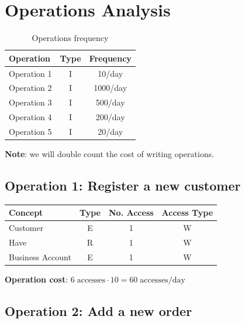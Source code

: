 \section*{Operations Analysis}
\begin{table}[H]
    \centering
    \begin{tabular}{|l|c|c|}
        \hline
        \textbf{Operation} & \textbf{Type} & \textbf{Frequency} \\
        \hline
        Operation 1 & I & 10/day \\
        \hline
        Operation 2 & I & 1000/day \\
        \hline
        Operation 3 & I & 500/day \\
        \hline
        Operation 4 & I & 200/day \\
        \hline
        Operation 5 & I & 20/day \\
        \hline
    \end{tabular}
    \caption{Operations frequency}
    \end{table}
    
    \textbf{Note}: we will double count the cost of writing operations.
    
    \subsection*{Operation 1: Register a new customer}
    
    \begin{table}[H]
    \centering
    \begin{tabular}{|l|c|c|c|}
    \hline
    \textbf{Concept} & \textbf{Type} & \textbf{No. Access} & \textbf{Access Type} \\
    \hline
    Customer         & E & 1 & W \\
    \hline
    Have             & R & 1 & W \\
    \hline
    Business Account & E & 1 & W \\
    \hline
    \end{tabular}
    \end{table}
    
    \textbf{Operation cost}: $6 \; \text{accesses} \cdot 10 = 60 \; \text{accesses/day}$
    
    \subsection*{Operation 2: Add a new order}
        
